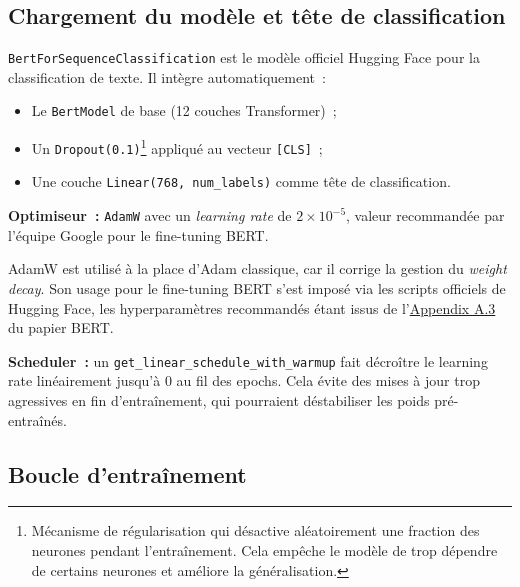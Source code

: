 \documentclass[12pt,a4paper]{article}
\begin{document}
\subsection{Chargement du modèle et tête de classification}

\texttt{BertForSequenceClassification} est le modèle officiel Hugging Face pour la
classification de texte. Il intègre automatiquement~:
\begin{itemize}[leftmargin=1.5cm]
  \item Le \texttt{BertModel} de base (12 couches Transformer)~;
  \item Un \texttt{Dropout(0.1)}\footnote[1]{Mécanisme de régularisation qui désactive aléatoirement une fraction des neurones
pendant l'entraînement. Cela empêche le modèle de trop dépendre de certains neurones
et améliore la généralisation.} appliqué au vecteur \texttt{[CLS]}~;
  \item Une couche \texttt{Linear(768, num\_labels)} comme tête de classification.
\end{itemize}

\textbf{Optimiseur~:} \texttt{AdamW} avec un \textit{learning rate} de $2\times10^{-5}$,
valeur recommandée par l'équipe Google pour le fine-tuning BERT.

\begin{tipbox}
AdamW est utilisé à la place d'Adam classique, car il corrige la gestion du \textit{weight decay}.
Son usage pour le fine-tuning BERT s'est imposé via les scripts officiels de Hugging Face, 
les hyperparamètres recommandés étant issus de l'\href{https://mccormickml.com/2019/07/22/BERT-fine-tuning/}{Appendix A.3} du papier BERT.
\end{tipbox}

\textbf{Scheduler~:} un \texttt{get\_linear\_schedule\_with\_warmup} fait décroître le
learning rate linéairement jusqu'à 0 au fil des epochs. Cela évite des mises à jour trop
agressives en fin d'entraînement, qui pourraient déstabiliser les poids pré-entraînés.

\subsection{Boucle d'entraînement}
\end{document}
